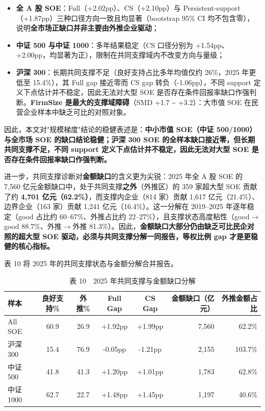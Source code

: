 \documentclass[11pt,a4paper]{ctexart}
\begin{document}
\begin{itemize}

  \item \textbf{全 A 股 SOE}：Full（+2.02pp）、CS（+2.10pp）与 Persistent-support（+1.87pp）三种口径方向一致且均显著（bootstrap 95\% CI 均不包含零），说明\textbf{全市场正缺口并非主要由外推企业驱动}；

  \item \textbf{中证 500 与中证 1000}：多年结果稳定（CS 口径分别为 +1.54pp、+2.00pp，均显著为正），限制在共同支撑域内不改变方向与量级；

  \item \textbf{沪深 300}：长期共同支撑不足（良好支持占比多年均值仅约 26\%，2025 年更低至 15.4\%），其 Full gap 接近零而 CS gap 转负（-1.06pp），不同 support 定义下点估计并不稳定，因此无法对大型 SOE 是否存在条件回报率缺口作强判断。\textbf{FirmSize 是最大的支撑域障碍}（SMD +1.7 \textasciitilde{} +3.2）：大市值 SOE 在民营企业样本中缺乏可比的对照对象。

\end{itemize}

因此，本文对"规模梯度"结论的稳健表述是：\textbf{中小市值 SOE（中证 500/1000）与全市场 SOE 的缺口结论稳健；沪深 300 SOE 的全样本缺口接近零，但长期共同支撑不足，不同 support 定义下点估计并不稳定，因此无法对大型 SOE 是否存在条件回报率缺口作强判断。}

进一步，共同支撑诊断对\textbf{金额缺口}的含义更为尖锐：2025 年全 A 股 SOE 的 7,560 亿元金额缺口中，处于共同支撑\textbf{之外}（外推区）的 359 家超大型 SOE 贡献了约 \textbf{4,701 亿元（62.2\%）}，而支撑内企业（814 家）贡献 1,617 亿元（21.4\%）、边界企业（163 家）贡献 1,241 亿元（16.4\%）。这一分解在 2019--2025 年逐年稳定（good 占比约 60--67\%、外推占比约 22--27\%），且支撑状态高度粘性（good$\to$good 88.7\%、外推$\to$外推 81.3\%）。因此，\textbf{金额缺口大部分仍由缺乏可比民企对照的超大型 SOE 驱动，必须与共同支撑分解一同报告，等权比例 gap 才是更稳健的核心指标。}

表 10 将 2025 年的共同支撑状态与金额分解合并报告。

\begin{table}[H]
\centering
\footnotesize
\caption{表 10　2025 年共同支撑与金额缺口分解}
\begin{tabular}{lccccrr}
\toprule
样本 & 良好支持\% & 外推\% & Full Gap & CS Gap & 金额缺口（亿元） & 外推金额占比 \\
\midrule
All SOE & 60.9 & 26.9 & +1.92pp & +1.99pp & 7,560 & 62.2\% \\
沪深300 & 15.4 & 76.9 & -0.05pp & -1.21pp & 2,155 & 103.7\% \\
中证500 & 41.8 & 41.3 & +1.20pp & +1.01pp & 1,783 & 62.8\% \\
中证1000 & 62.7 & 22.7 & +1.48pp & +1.45pp & 1,197 & 40.6\% \\
\bottomrule
\end{tabular}
\end{table}
\end{document}
